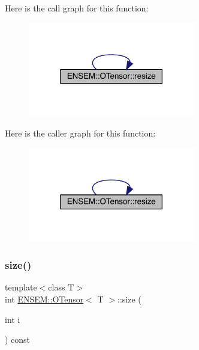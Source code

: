 Here is the call graph for this function\+:
\nopagebreak
\begin{figure}[H]
\begin{center}
\leavevmode
\includegraphics[width=207pt]{da/d8a/classENSEM_1_1OTensor_aee9b85f3726c01139b9194a3b95809d3_cgraph}
\end{center}
\end{figure}
Here is the caller graph for this function\+:
\nopagebreak
\begin{figure}[H]
\begin{center}
\leavevmode
\includegraphics[width=207pt]{da/d8a/classENSEM_1_1OTensor_aee9b85f3726c01139b9194a3b95809d3_icgraph}
\end{center}
\end{figure}
\mbox{\label{classENSEM_1_1OTensor_aeb39779caeadcbcea94d9ef629913287}} 
\subsubsection{\texorpdfstring{size()}{size()}\hspace{0.1cm}{\footnotesize\ttfamily [1/4]}}
{\footnotesize\ttfamily template$<$class T$>$ \\
int \mbox{\hyperlink{classENSEM_1_1OTensor}{E\+N\+S\+E\+M\+::\+O\+Tensor}}$<$ T $>$\+::size (\begin{DoxyParamCaption}\item[{int}]{i }\end{DoxyParamCaption}) const\hspace{0.3cm}{\ttfamily [inline]}}



